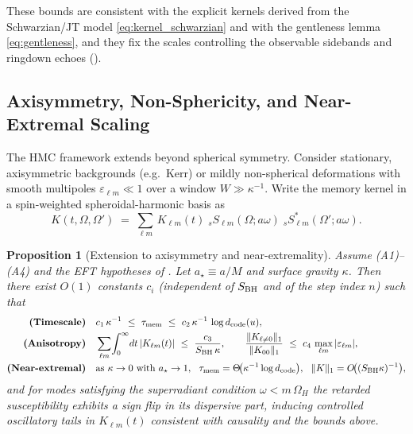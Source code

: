\documentclass[a4paper,11pt]{article}
\newcommand{\HMC}{\textsc{HMC}\xspace}
\theoremstyle{plain}
\newtheorem{proposition}{Proposition}
\theoremstyle{definition}
\theoremstyle{remark}
\begin{document}
These bounds are consistent with the explicit kernels derived from the Schwarzian/JT model \eqref{eq:kernel_schwarzian} and with the
gentleness lemma \eqref{eq:gentleness}, and they fix the scales controlling the observable sidebands and ringdown echoes
().

\subsection{Axisymmetry, Non-Sphericity, and Near-Extremal Scaling} %
\label{sec:axisymmetry}
The \HMC{} framework extends beyond spherical symmetry. Consider stationary, axisymmetric backgrounds (e.g.~Kerr) or mildly
non-spherical deformations with smooth multipoles $\varepsilon_{\ell m}\ll 1$ over a window $W\gg \kappa^{-1}$.
Write the memory kernel in a spin-weighted spheroidal-harmonic basis as
\begin{equation}
K(t,\Omega,\Omega') \;=\; \sum_{\ell m}\,K_{\ell m}(t)\;{}_{s}S_{\ell m}(\Omega;a\omega)\;{}_{s}S^{\ast}_{\ell m}(\Omega';a\omega).\label{eq:kernel_anisotropic}
\end{equation}
\begin{proposition}[Extension to axisymmetry and near-extremality]\label{prop:axisymmetry}
Assume (A1)--(A4) and the EFT hypotheses of . Let $a_\star\equiv a/M$ and surface gravity $\kappa$.
Then there exist $O(1)$ constants $c_i$ (independent of $S_{\rm BH}$ and of the step index $n$) such that
\begin{align}
\textbf{(Timescale)}\quad& c_1\,\kappa^{-1}\ \le\ \tau_{\rm mem}\ \le\ c_2\,\kappa^{-1}\,\log d_{\rm code}(u),\label{eq:axis_timescale}\\
\textbf{(Anisotropy)}\quad& \sum_{\ell m}\!\int_0^\infty\!dt\,|K_{\ell m}(t)|\ \le\ \frac{c_3}{S_{\rm BH}\,\kappa},\qquad
\frac{\|K_{\ell\neq 0}\|_1}{\|K_{00}\|_1}\ \le\ c_4\,\max_{\ell m}|\varepsilon_{\ell m}|,\label{eq:axis_anisotropy}\\
\textbf{(Near-extremal)}\quad& \text{as }\kappa\to 0 \text{ with } a_\star\to 1,\ \ \tau_{\rm mem} = \Theta\!\big(\kappa^{-1}\log d_{\rm code}\big),\ \ 
\|K\|_1 = O\!\big((S_{\rm BH}\kappa)^{-1}\big),\label{eq:axis_extremal}
\end{align}
and for modes satisfying the superradiant condition $\omega<m\,\Omega_H$ the retarded susceptibility exhibits a sign flip in its dispersive part, inducing
controlled oscillatory tails in $K_{\ell m}(t)$ consistent with causality and the bounds above.
\end{proposition}
\end{document}
